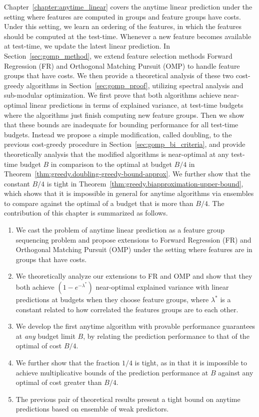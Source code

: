 Chapter~\ref{chapter:anytime_linear} covers the anytime linear prediction under the setting where features are computed in groups and feature groups have costs. Under this setting, we learn an ordering of the features, in which the features should be computed at the test-time. Whenever a new feature becomes available at test-time, we update the latest linear prediction. In Section~\ref{sec:gomp_method}, we extend feature selection methods Forward Regression (FR) and Orthogonal Matching Pursuit (OMP) to handle feature groups that have costs. We then provide a theoretical analysis of these two cost-greedy algorithms in Section~\ref{sec:gomp_proof}, utilizing spectral analysis and sub-modular optimization. We first prove that both algorithms achieve near-optimal linear predictions in terms of explained variance, at test-time budgets where the algorithms just finish computing new feature groups. 
Then we show that these bounds are inadequate for bounding performance for all test-time budgets. Instead we propose a simple modification, called doubling, to the previous cost-greedy procedure in Section~\ref{sec:gomp_bi_criteria}, and provide theoretically analysis that the modified algorithms is near-optimal at any test-time budget $B$ in comparison to the optimal at budget $B/4$ in Theorem~\ref{thm:greedy.doubling-greedy-bound-approx}. We further show that the constant $B/4$ is tight in Theorem~\ref{thm:greedy.biapproximation-upper-bound}, which shows that it is impossible in general for anytime algorithms via ensembles to compare against the optimal of a budget that is more than $B/4$. The contribution of this chapter is summarized as follows.

\begin{enumerate}
\item We cast the problem of anytime linear prediction 
as a feature group sequencing problem  
and propose extensions to Forward Regression (FR) and Orthogonal Matching Pursuit (OMP)
under the setting where features are in
groups that have costs. 
\item We theoretically analyze our extensions to FR and OMP 
and show that they both achieve $(1-e^{-\lambda^*})$ near-optimal 
explained variance with linear predictions at budgets when 
they choose feature groups, where $\lambda^*$ is a constant related to how correlated the 
features groups are to each other.
\item We develop the first anytime algorithm 
with provable performance guarantees at \textit{any} budget limit $B$, 
by relating the prediction performance to that of the optimal of cost 
$B/4$. 
\item We further show that the fraction $1/4$ is tight, as in that it is 
impossible to achieve multiplicative bounds of the prediction performance at $B$ 
against any optimal of cost greater than $B/4$. 
\item The previous pair of theoretical results  present a tight bound on 
anytime predictions based on ensemble of weak predictors.
\end{enumerate}

